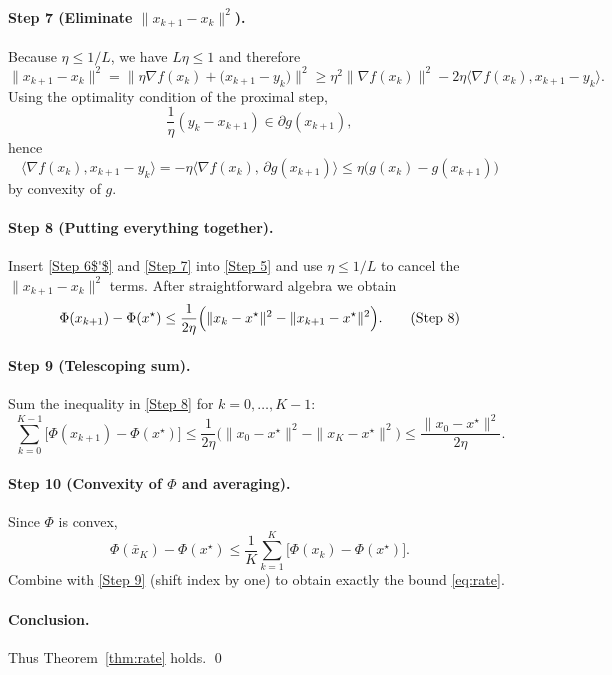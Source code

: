 \documentclass{article}
\begin{document}
\begin{enumerate}
\paragraph{Step 7 (Eliminate $\|x_{k+1}-x_{k}\|^{2}$).}
Because $\eta\le 1/L$, we have $L\eta\le1$ and therefore
\[
\|x_{k+1}-x_{k}\|^{2}
= \|\eta\nabla f(x_{k})+\bigl(x_{k+1}-y_{k}\bigr)\|^{2}
\ge \eta^{2}\|\nabla f(x_{k})\|^{2}
    -2\eta\langle\nabla f(x_{k}),x_{k+1}-y_{k}\rangle .
\]
Using the optimality condition of the proximal step,
\[
\frac{1}{\eta}(y_{k}-x_{k+1})\in\partial g(x_{k+1}) ,
\]
hence
\[
\langle \nabla f(x_{k}),x_{k+1}-y_{k}\rangle
= -\eta\langle \nabla f(x_{k}),\,\partial g(x_{k+1})\rangle
\le \eta\bigl(g(x_{k})-g(x_{k+1})\bigr)    \tag{Step 7}
\]
by convexity of $g$.

\paragraph{Step 8 (Putting everything together).}
Insert \eqref{Step 6$'$} and \eqref{Step 7} into \eqref{Step 5} and use $\eta\le1/L$ to cancel the $\|x_{k+1}-x_{k}\|^{2}$ terms. After straightforward algebra we obtain
\[
\Phi(x_{k+1})-\Phi(x^{\star})
\le \frac{1}{2\eta}\Bigl(\|x_{k}-x^{\star}\|^{2}
                         -\|x_{k+1}-x^{\star}\|^{2}\Bigr). \tag{Step 8}
\]

\paragraph{Step 9 (Telescoping sum).}
Sum the inequality in \eqref{Step 8} for $k=0,\dots,K-1$:
\[
\sum_{k=0}^{K-1}\bigl[\Phi(x_{k+1})-\Phi(x^{\star})\bigr]
\le \frac{1}{2\eta}\bigl(\|x_{0}-x^{\star}\|^{2}
                       -\|x_{K}-x^{\star}\|^{2}\bigr)
\le \frac{\|x_{0}-x^{\star}\|^{2}}{2\eta}. \tag{Step 9}
\]

\paragraph{Step 10 (Convexity of $\Phi$ and averaging).}
Since $\Phi$ is convex,
\[
\Phi(\bar{x}_{K})-\Phi(x^{\star})
\le\frac{1}{K}\sum_{k=1}^{K}\bigl[\Phi(x_{k})-\Phi(x^{\star})\bigr].
\]
Combine with \eqref{Step 9} (shift index by one) to obtain exactly the bound \eqref{eq:rate}.

\paragraph{Conclusion.}
Thus Theorem~\ref{thm:rate} holds. \qed


\end{enumerate}
\end{document}
